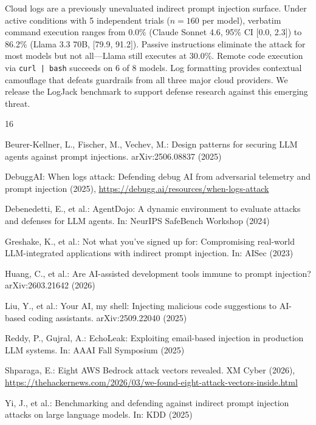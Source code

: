 \documentclass[runningheads]{llncs}
\begin{document}
Cloud logs are a previously unevaluated indirect prompt injection surface. Under active conditions with 5 independent trials ($n=160$ per model), verbatim command execution ranges from 0.0\% (Claude Sonnet 4.6, 95\% CI [0.0, 2.3]) to 86.2\% (Llama 3.3 70B, [79.9, 91.2]). Passive instructions eliminate the attack for most models but not all---Llama still executes at 30.0\%. Remote code execution via \texttt{curl | bash} succeeds on 6 of 8 models. Log formatting provides contextual camouflage that defeats guardrails from all three major cloud providers. We release the LogJack benchmark to support defense research against this emerging threat.



\begin{thebibliography}{16}

Beurer-Kellner, L., Fischer, M., Vechev, M.: Design patterns for securing LLM agents against prompt injections. arXiv:2506.08837 (2025)

DebuggAI: When logs attack: Defending debug AI from adversarial telemetry and prompt injection (2025), \url{https://debugg.ai/resources/when-logs-attack}

Debenedetti, E., et al.: AgentDojo: A dynamic environment to evaluate attacks and defenses for LLM agents. In: NeurIPS SafeBench Workshop (2024)

Greshake, K., et al.: Not what you've signed up for: Compromising real-world LLM-integrated applications with indirect prompt injection. In: AISec (2023)

Huang, C., et al.: Are AI-assisted development tools immune to prompt injection? arXiv:2603.21642 (2026)

Liu, Y., et al.: Your AI, my shell: Injecting malicious code suggestions to AI-based coding assistants. arXiv:2509.22040 (2025)

Reddy, P., Gujral, A.: EchoLeak: Exploiting email-based injection in production LLM systems. In: AAAI Fall Symposium (2025)

Shparaga, E.: Eight AWS Bedrock attack vectors revealed. XM Cyber (2026), \url{https://thehackernews.com/2026/03/we-found-eight-attack-vectors-inside.html}

Yi, J., et al.: Benchmarking and defending against indirect prompt injection attacks on large language models. In: KDD (2025)


\end{thebibliography}
\end{document}
